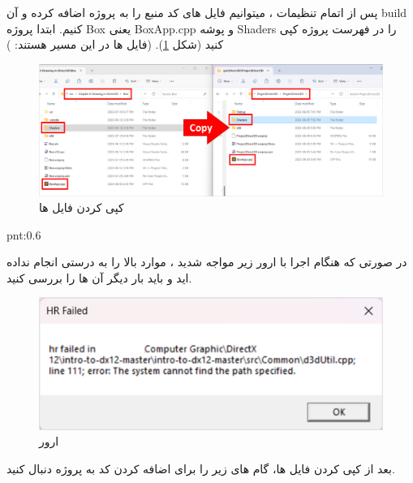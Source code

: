 \textbf{\vspace{-30pt}}
\title{
    \LARGE
}
\textbf{\vspace{-15pt}}

{
    \Large
    \begin{spacing}{1.3}
        پس از اتمام تنظیمات ، میتوانیم فایل های کد منبع را به پروژه اضافه کرده و آن build کنیم.
        ابتدا پروژه Box یعنی BoxApp.cpp و پوشه Shaders را در فهرست پروژه کپی کنید (شکل \ref{fig:3.Intro.5.8.1}).
        (فایل ها در این مسیر هستند: )

        \begin{figure}[H]
            \centering
            \setlength{\belowcaptionskip}{-10pt}
            \includegraphics[width=\textwidth]{Images/3/3.Intro.5.8.1}
            \caption{کپی کردن فایل ها}
            \label{fig:3.Intro.5.8.1}
        \end{figure}

        \begin{point}{pnt:0.6}
        {
            \Large
            در صورتی که هنگام اجرا با ارور زیر مواجه شدید ، موارد بالا را به درستی انجام نداده اید و باید بار دیگر آن ها را بررسی کنید.

            \begin{figure}[H]
                \centering
                \setlength{\belowcaptionskip}{-10pt}
                \includegraphics[scale=0.8]{Images/3/3.Intro.5.8.2}
                \caption{ارور  \textbf{\vspace{12pt}}}
                \label{fig:3.Intro.5.8.2}
            \end{figure}
        }
        \end{point}
        \textbf{\vspace{6pt}}
        بعد از کپی کردن فایل ها، گام های زیر را برای اضافه کردن کد به پروژه دنبال کنید.


\end{spacing}}

